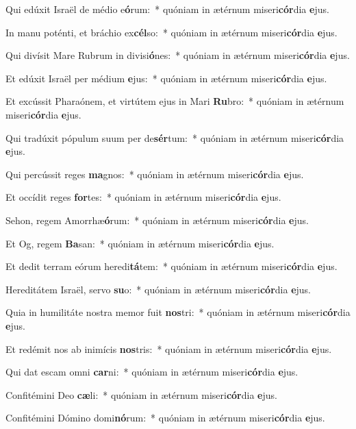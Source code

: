\item Qui edúxit Israël de médio e\textbf{ó}rum:~* quóniam in ætérnum miseri\textbf{cór}dia \textbf{e}jus.
\item In manu poténti, et bráchio ex\textbf{cél}so:~* quóniam in ætérnum miseri\textbf{cór}dia \textbf{e}jus.
\item Qui divísit Mare Rubrum in divisi\textbf{ó}nes:~* quóniam in ætérnum miseri\textbf{cór}dia \textbf{e}jus.
\item Et edúxit Israël per médium \textbf{e}jus:~* quóniam in ætérnum miseri\textbf{cór}dia \textbf{e}jus.
\item Et excússit Pharaónem, et virtútem ejus in Mari \textbf{Ru}bro:~* quóniam in ætérnum miseri\textbf{cór}dia \textbf{e}jus.
\item Qui tradúxit pópulum suum per de\textbf{sér}tum:~* quóniam in ætérnum miseri\textbf{cór}dia \textbf{e}jus.
\item Qui percússit reges \textbf{ma}gnos:~* quóniam in ætérnum miseri\textbf{cór}dia \textbf{e}jus.
\item Et occídit reges \textbf{for}tes:~* quóniam in ætérnum miseri\textbf{cór}dia \textbf{e}jus.
\item Sehon, regem Amorrhæ\textbf{ó}rum:~* quóniam in ætérnum miseri\textbf{cór}dia \textbf{e}jus.
\item Et Og, regem \textbf{Ba}san:~* quóniam in ætérnum miseri\textbf{cór}dia \textbf{e}jus.
\item Et dedit terram eórum heredi\textbf{tá}tem:~* quóniam in ætérnum miseri\textbf{cór}dia \textbf{e}jus.
\item Hereditátem Israël, servo \textbf{su}o:~* quóniam in ætérnum miseri\textbf{cór}dia \textbf{e}jus.
\item Quia in humilitáte nostra memor fuit \textbf{nos}tri:~* quóniam in ætérnum miseri\textbf{cór}dia \textbf{e}jus.
\item Et redémit nos ab inimícis \textbf{nos}tris:~* quóniam in ætérnum miseri\textbf{cór}dia \textbf{e}jus.
\item Qui dat escam omni \textbf{car}ni:~* quóniam in ætérnum miseri\textbf{cór}dia \textbf{e}jus.
\item Confitémini Deo \textbf{cæ}li:~* quóniam in ætérnum miseri\textbf{cór}dia \textbf{e}jus.
\item Confitémini Dómino domi\textbf{nó}rum:~* quóniam in ætérnum miseri\textbf{cór}dia \textbf{e}jus.

